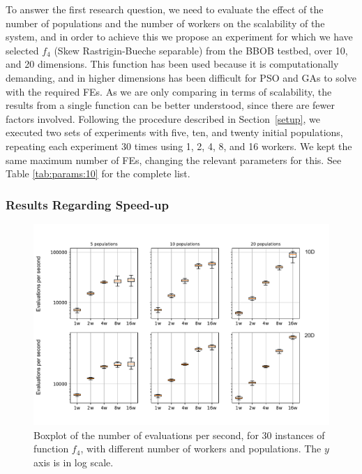 \documentclass[review]{elsarticle}
\begin{document}
To answer the first research question, we need to evaluate the effect of the
number of populations and the number of workers on the scalability of the
system, and in order to achieve this we propose an experiment for
which we have selected $f_4$ (Skew
Rastrigin-Bueche separable) from the BBOB testbed, over 10, and 20 dimensions. This function has been used
because it is computationally demanding, and in higher dimensions has been
difficult for PSO \cite{el2009black} and GAs \cite{nicolau2009application} to
solve with the required FEs. As we are only comparing in terms of scalability,
the results from a single function can be better understood, since there are
fewer factors involved. Following the procedure described in
Section~\ref{setup}, we executed two sets of experiments with five, ten, and twenty
initial populations, repeating each experiment 30 times using 1, 2, 4, 8, and 16
workers. We kept the same maximum number of FEs, changing the relevant
parameters for this. See Table \ref{tab:params:10} for the complete list.

\subsubsection{Results Regarding Speed-up}
\label{sec:speedup}

\begin{figure}[h!tbp]
  \centering
  \includegraphics[width=\textwidth]{eval_ratio}
  \caption{Boxplot of the number of evaluations per second, for 30 instances of function $f_4$,
          with different number of workers and  populations. The $y$ axis is in log scale.}
  \label{fig:spworker:evalspersecond}
\end{figure}
\end{document}

